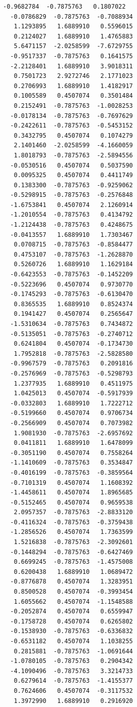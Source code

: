 \documentclass[11pt]{article}
\begin{document}
\begin{Verbatim}[commandchars=\\\{\}]
  -0.9682784  -0.7875763   0.1807022
  -0.0786829  -0.7875763  -0.7088934
   1.1293895   1.6889910   0.5596015
   0.2124027   1.6889910   1.4765883
   5.6471157  -2.0258599  -7.6729755
  -0.9517337  -0.7875763   0.1641575
  -2.2128401   1.6889910   3.9018311
   0.7501723   2.9272746   2.1771023
   0.2706993   1.6889910   1.4182917
   0.1005589   0.4507074   0.3501484
   0.2152491  -0.7875763  -1.0028253
  -0.0178134  -0.7875763  -0.7697629
  -0.2422611  -0.7875763  -0.5453152
   0.3432795   0.4507074   0.1074279
   2.1401460  -2.0258599  -4.1660059
   1.8018793  -0.7875763  -2.5894556
  -0.0530516   0.4507074   0.5037590
   0.0095325   0.4507074   0.4411749
   0.1383300  -0.7875763  -0.9259062
  -0.5298915  -0.7875763  -0.2576848
  -1.6753841   0.4507074   2.1260914
  -1.2010554  -0.7875763   0.4134792
  -1.2124438  -0.7875763   0.4248675
  -0.0413557   1.6889910   1.7303467
   0.0708715  -0.7875763  -0.8584477
   0.4753107  -0.7875763  -1.2628870
   0.5260726   1.6889910   1.1629184
  -0.6423553  -0.7875763  -0.1452209
  -0.5223696   0.4507074   0.9730770
  -0.1745293  -0.7875763  -0.6130470
   0.8365535   1.6889910   0.8524374
   0.1941427   0.4507074   0.2565647
  -1.5310634  -0.7875763   0.7434872
  -0.5135051  -0.7875763  -0.2740712
   0.6241804   0.4507074  -0.1734730
   1.7952818  -0.7875763  -2.5828580
  -0.9967579  -0.7875763   0.2091816
  -0.2576969  -0.7875763  -0.5298793
   1.2377935   1.6889910   0.4511975
   1.0425013   0.4507074  -0.5917939
  -0.0332803   1.6889910   1.7222712
  -0.5199660   0.4507074   0.9706734
  -0.2566909   0.4507074   0.7073982
   1.9081930  -0.7875763  -2.6957692
   0.0411811   1.6889910   1.6478099
  -0.3051190   0.4507074   0.7558264
  -1.1410609  -0.7875763   0.3534847
  -0.4016199  -0.7875763  -0.3859564
  -0.7101319   0.4507074   1.1608392
  -1.4458611   0.4507074   1.8965685
  -0.5152465   0.4507074   0.9659538
   2.0957357  -0.7875763  -2.8833120
  -0.4116324  -0.7875763  -0.3759438
  -1.2856526   0.4507074   1.7363599
   1.5216838  -0.7875763  -2.3092601
  -0.1448294  -0.7875763  -0.6427469
   0.6699245  -0.7875763  -1.4575008
   0.6200438   1.6889910   1.0689472
  -0.8776878   0.4507074   1.3283951
   0.8500528   0.4507074  -0.3993454
   1.6055662   0.4507074  -1.1548588
  -0.2052874   0.4507074   0.6559947
  -0.1758728   0.4507074   0.6265802
  -0.1538930  -0.7875763  -0.6336832
  -0.6531182   0.4507074   1.1038255
   0.2815881  -0.7875763  -1.0691644
  -1.0780105  -0.7875763   0.2904342
  -4.1090496  -0.7875763   3.3214733
   0.6279614  -0.7875763  -1.4155377
   0.7624606   0.4507074  -0.3117532
   1.3972990   1.6889910   0.2916920

\end{Verbatim}
\end{document}
